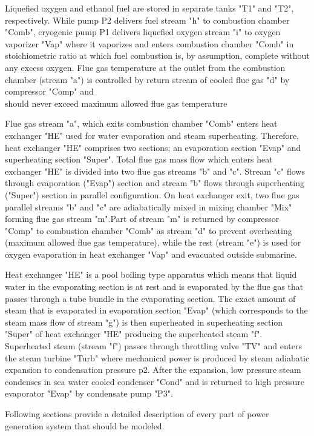 \documentclass{article}
\begin{document}
	Liquefied oxygen and ethanol fuel are stored in separate tanks "T1" and 
	"T2", respectively. While pump P2 delivers fuel stream "h" to combustion 
	chamber "Comb", cryogenic pump P1 delivers liquefied oxygen stream "i" to 
	oxygen vaporizer "Vap" where it vaporizes and enters combustion chamber 
	"Comb" in stoichiometric ratio at which fuel combustion is, by assumption, 
	complete without any excess oxygen. Flue gas temperature at the outlet from 
	the combustion chamber (stream "a") is controlled by return stream of 
	cooled flue gas "d" by compressor "Comp" and\\
	 should never exceed maximum allowed flue gas temperature %
	
	Flue gas stream "a", which exits combustion chamber "Comb" enters heat 
	exchanger "HE" used for water evaporation and steam superheating. 
	Therefore, heat exchanger "HE" comprises two sections; an evaporation 
	section "Evap" and superheating section "Super". Total 
	flue gas mass flow which enters heat exchanger "HE" is divided into two 
	flue gas streams "b" and "c". Stream "c" flows through evaporation ("Evap") 
	section and stream "b" flows through superheating ("Super") section in 
	parallel configuration. On heat exchanger exit, two flue gas parallel 
	streams "b" and "c" are adiabatically mixed in mixing chamber "Mix" forming 
	flue gas stream "m".Part of stream "m" is returned by compressor "Comp" to 
	combustion chamber "Comb" as stream "d" to prevent overheating (maximum 
	allowed flue gas temperature), while the rest (stream "e") is used for 
	oxygen evaporation in heat exchanger "Vap" and evacuated outside submarine.
	  
	Heat exchanger "HE" is a pool boiling type apparatus which means that liquid water in the evaporating section is at rest and is evaporated by the flue gas that passes through a tube bundle in the evaporating section. The exact amount of steam that is evaporated in evaporation section "Evap" (which corresponds to the steam mass flow of stream "g") is then superheated in superheating section "Super" of heat exchanger "HE" producing the superheated steam "f". Superheated steam (stream "f") passes through throttling valve "TV" and enters the steam turbine "Turb" where mechanical power is produced by steam adiabatic expansion to condensation pressure p2. After the expansion, low pressure steam condenses in sea water cooled condenser "Cond" and is returned to high pressure evaporator "Evap" by condensate pump "P3". 
	
	
	Following sections provide a detailed description of every part of power 
	generation system that should be modeled.
	
\end{document}
